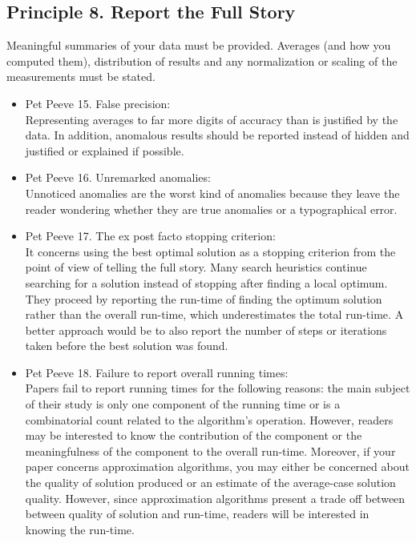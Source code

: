 \documentclass[]{scrartcl}
\begin{document}
\subsection*{Principle 8. Report the Full Story}
Meaningful summaries of your data must be provided. Averages (and how you computed them), distribution of results and any normalization or scaling of the measurements must be stated.
\begin{itemize}
	\item Pet Peeve 15. False precision: \\
	Representing averages to far more digits of accuracy than is justified by the data. In addition, anomalous results should be reported instead of hidden and justified or explained if possible.
	\item Pet Peeve 16. Unremarked anomalies: \\
	Unnoticed anomalies are the worst kind of anomalies because they leave the reader wondering whether they are true anomalies or a typographical error.
	\item Pet Peeve 17. The ex post facto stopping criterion: \\
	It concerns using the best optimal solution as a stopping criterion from the point of view of telling the full story. Many search heuristics continue searching for a solution instead of stopping after finding a local optimum. They proceed by reporting the run-time of finding the optimum solution rather than the overall run-time, which underestimates the total run-time. A better approach would be to also report the number of steps or iterations taken before the best solution was found.
	\item Pet Peeve 18. Failure to report overall running times: \\
	Papers fail to report running times for the following reasons: the main subject of their study is only one component of the running time or is a combinatorial count related to the algorithm's operation. However, readers may be interested to know the contribution of the component or the meaningfulness of the component to the overall run-time. Moreover, if your paper concerns approximation algorithms, you may either be concerned about the quality of solution produced or an estimate of the average-case solution quality. However, since approximation algorithms present a trade off between between quality of solution and run-time, readers will be interested in knowing the run-time.
\end{itemize}
\end{document}
